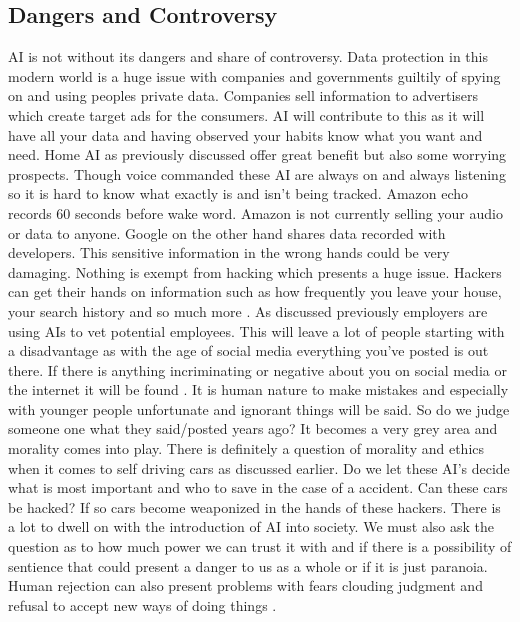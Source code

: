 \documentclass[conference]{IEEEtran}
\begin{document}
\subsection{Dangers and Controversy}
AI is not without its dangers and share of controversy. Data protection in this modern world is a huge issue with companies and governments guiltily of spying on and using peoples private data. Companies sell information to advertisers which create target ads for the consumers. AI will contribute to this as it will have all your data and having observed your habits know what you want and need. Home AI as previously discussed offer great benefit but also some worrying prospects. Though voice commanded these AI are always on and always listening so it is hard to know what exactly is and isn't being tracked. Amazon echo records 60 seconds before wake word. Amazon is not currently selling your audio or data to anyone. Google on the other hand shares data recorded with developers. This sensitive information in the wrong hands could be very damaging. Nothing is exempt from hacking which presents a huge issue. Hackers can get their hands on information such as how frequently you leave your house, your search history and so much more \cite{SmartHome}. As discussed previously employers are using AIs to vet potential employees. This will leave a lot of people starting with a disadvantage as with the age of social media everything you've posted is out there. If there is anything incriminating or negative about you on social media or the internet it will be found \cite{Employers}. It is human nature to make mistakes and especially with younger people unfortunate and ignorant things will be said. So do we judge someone one what they said/posted years ago? It becomes a very grey area and morality comes into play. There is definitely a question of morality and ethics when it comes to self driving cars as discussed earlier. Do we let these AI's decide what is most important and who to save in the case of a accident. Can these cars be hacked? If so cars become weaponized in the hands of these hackers. There is a lot to dwell on with the introduction of AI into society. We must also ask the question as to how much power we can trust it with and if there is a possibility of sentience that could present a danger to us as a whole or if it is just paranoia. Human rejection can also present problems with fears clouding judgment and refusal to accept new ways of doing things \cite{Dangers}.
\end{document}
